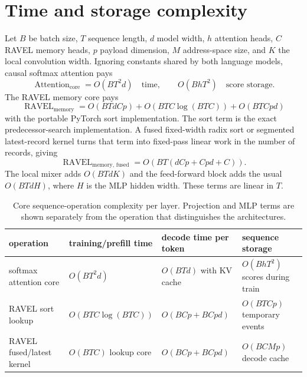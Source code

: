 \documentclass[10pt]{article}
\begin{document}
\section{Time and storage complexity}
\label{sec:complexity}

Let $B$ be batch size, $T$ sequence length, $d$ model width, $h$ attention heads, $C$ RAVEL memory heads, $p$ payload dimension, $M$ address-space size, and $K$ the local convolution width. Ignoring constants shared by both language models, causal softmax attention pays
\begin{equation}
  \operatorname{Attention}_{\text{core}}
  =
  O(BT^2d)
  \quad\text{time},\qquad
  O(BhT^2)
  \quad\text{score storage}.
\end{equation}
The RAVEL memory core pays
\begin{equation}
  \operatorname{RAVEL}_{\text{memory}}
  =
  O(BTdCp)
  +
  O(BTC\log(BTC))
  +
  O(BTCpd)
\end{equation}
with the portable PyTorch sort implementation. The sort term is the exact predecessor-search implementation. A fused fixed-width radix sort or segmented latest-record kernel turns that term into fixed-pass linear work in the number of records, giving
\begin{equation}
  \operatorname{RAVEL}_{\text{memory, fused}}
  =
  O(BT(dCp+Cpd+C)).
\end{equation}
The local mixer adds $O(BTdK)$ and the feed-forward block adds the usual $O(BTdH)$, where $H$ is the MLP hidden width. These terms are linear in $T$.

\begin{table}[H]
  \centering
  \small
  \caption{Core sequence-operation complexity per layer. Projection and MLP terms are shown separately from the operation that distinguishes the architectures.}
  \label{tab:complexity}
  \begin{tabular}{llll}
    \toprule
    operation & training/prefill time & decode time per token & sequence storage \\
    \midrule
    softmax attention core & $O(BT^2d)$ & $O(BT d)$ with KV cache & $O(BhT^2)$ scores during train \\
    RAVEL sort lookup & $O(BTC\log(BTC))$ & $O(BCp+BCpd)$ & $O(BTCp)$ temporary events \\
    RAVEL fused/latest kernel & $O(BTC)$ lookup core & $O(BCp+BCpd)$ & $O(BCMp)$ decode cache \\
    \bottomrule
  \end{tabular}
\end{table}
\end{document}
